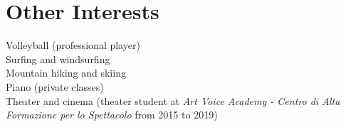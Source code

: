 \documentclass[letterpaper,11pt]{article}
\begin{document}
\section{Other Interests}
{
\footnotesize{
Volleyball (professional player) \\ 
Surfing and windsurfing \\ 
Mountain hiking and skiing \\ 
Piano (private classes) \\ 
Theater and cinema (theater student at \textit{Art Voice Academy - Centro di Alta Formazione per lo Spettacolo} from 2015 to 2019)
}
}

\end{document}
